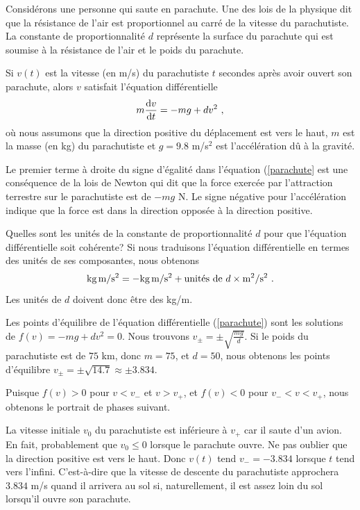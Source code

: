 {\begin{egg}[\eng]
Considérons une personne qui saute en parachute.  Une des lois de la
physique dit que la résistance de l'air est proportionnel au carré de la
vitesse du parachutiste.  La constante de proportionnalité $d$
représente la surface du parachute qui est soumise à la résistance de
l'air et le poids du parachute.

Si $v(t)$ est la vitesse (en m/s) du parachutiste $t$ secondes après
avoir ouvert son parachute, alors $v$ satisfait l'équation différentielle
\begin{equation}\label{parachute}
  m \frac{\mathrm{d}v}{\mathrm{d}t} = - m g + d v^2  \ ,
\end{equation}
où nous assumons que la direction positive du déplacement est vers le
haut, $m$ est la masse (en kg) du parachutiste et $g = 9.8$ m/s$^2$ est
l'accélération dû à la gravité.

Le premier terme à droite du signe d'égalité dans l'équation
(\ref{parachute} est une conséquence de la lois de Newton qui dit que
la force exercée par l'attraction terrestre sur le parachutiste est de
$-m g$ N.  Le signe négative pour l'accélération indique que la force
est dans la direction opposée à la direction positive.

Quelles sont les unités de la constante de proportionnalité $d$ pour
que l'équation différentielle soit cohérente?   Si nous traduisons
l'équation différentielle en termes des unités de ses composantes,
nous obtenons 
\[
\text{kg\,m}/\text{s}^2 = - \text{kg\,m}/\text{s}^2
+ \text{unités de }d \times \text{m}^2/\text{s}^2 \ .
\]
Les unités de $d$ doivent donc être des kg/m.  

Les points d'équilibre de l'équation différentielle (\ref{parachute})
sont les solutions de $f(v)= - m g + d v^2 = 0$.  Nous trouvons
$\displaystyle v_\pm = \pm \sqrt{\frac{mg}{d}}$.
Si le poids du parachutiste est de $75$ km, donc $m=75$, et
$d= 50$, nous obtenons les points d'équilibre
$v_\pm = \pm \sqrt{14.7} \approx \pm 3.834$.

Puisque $f(v) >0$ pour $v<v_-$ et $v>v_+$, et $f(v) <0$ pour $v_-<v<v_+$, nous
obtenons le portrait de phases suivant.

La vitesse initiale $v_0$ du parachutiste est inférieure à $v_+$ car
il saute d'un avion.  En fait, probablement que $v_0 \leq 0$ lorsque
le parachute ouvre.  Ne pas oublier que la direction positive est vers
le haut.  Donc $v(t)$ tend $v_- = -3.834$ lorsque $t$ tend vers
l'infini.  C'est-à-dire que la vitesse de descente du parachutiste
approchera $3.834$ m/s quand il arrivera au sol si, naturellement, il
est assez loin du sol lorsqu'il ouvre son parachute.


\end{egg}}
